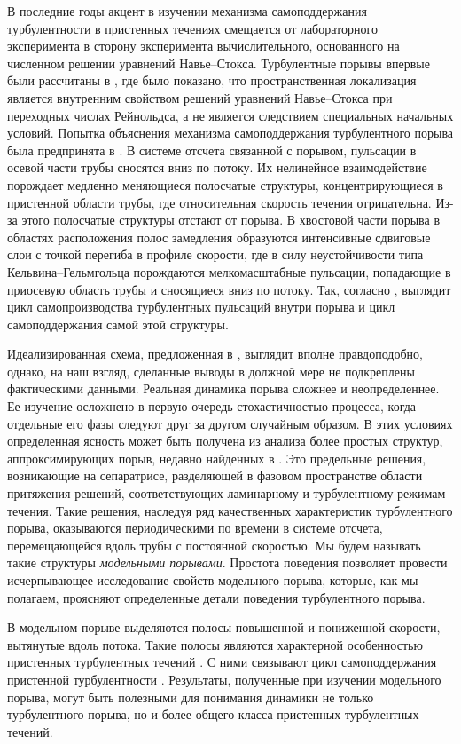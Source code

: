 В последние годы акцент в изучении механизма самоподдержания турбулентности в пристенных течениях смещается от лабораторного эксперимента в сторону эксперимента вычислительного, основанного на численном решении уравнений Навье--Стокса. Турбулентные порывы впервые были рассчитаны в \cite{Priymak2004}, где было показано, что пространственная локализация является внутренним свойством решений уравнений Навье--Стокса при переходных числах Рейнольдса, а не является следствием специальных начальных условий. Попытка объяснения механизма самоподдержания турбулентного порыва была предпринята в \cite{Shimizu2009}. В системе отсчета связанной с порывом, пульсации в осевой части трубы сносятся вниз по потоку. Их нелинейное взаимодействие порождает медленно меняющиеся полосчатые структуры, концентрирующиеся в пристенной области трубы, где относительная скорость течения отрицательна. Из-за этого полосчатые структуры отстают от порыва. В хвостовой части порыва в областях расположения полос замедления образуются интенсивные сдвиговые слои с точкой перегиба в профиле скорости, где в силу неустойчивости типа Кельвина--Гельмгольца порождаются мелкомасштабные пульсации, попадающие в приосевую область трубы и сносящиеся вниз по потоку. Так, согласно \cite{Shimizu2009}, выглядит цикл самопроизводства турбулентных пульсаций внутри порыва и цикл самоподдержания самой этой структуры.

Идеализированная схема, предложенная в \cite{Shimizu2009}, выглядит вполне правдоподобно, однако, на наш взгляд, сделанные выводы в должной мере не подкреплены фактическими данными. Реальная динамика порыва сложнее и неопределеннее. Ее изучение осложнено в первую очередь стохастичностью процесса, когда отдельные его фазы следуют друг за другом случайным образом. В этих условиях определенная ясность может быть получена из анализа более простых структур, аппроксимирующих порыв, недавно найденных в \cite{Skufca2006, Avila2013}. Это предельные решения, возникающие на сепаратрисе, разделяющей в фазовом пространстве области притяжения решений, соответствующих ламинарному и турбулентному режимам течения. Такие решения, наследуя ряд качественных характеристик турбулентного порыва, оказываются периодическими по времени в системе отсчета, перемещающейся вдоль трубы с постоянной скоростью. Мы будем называть такие структуры {\it модельными порывами}. Простота поведения позволяет провести исчерпывающее исследование свойств модельного порыва, которые, как мы полагаем, проясняют определенные детали поведения турбулентного порыва. 

В модельном порыве выделяются полосы повышенной и пониженной скорости, вытянутые вдоль потока. Такие полосы являются характерной особенностью пристенных турбулентных течений \cite{Klebanoff1962, Kline1967}. С ними связывают цикл самоподдержания пристенной турбулентности \cite{Hamilton1995, Waleffe1997, Schoppa2002}. Результаты, полученные при изучении модельного порыва, могут быть полезными для понимания динамики не только турбулентного порыва, но и более общего класса пристенных турбулентных течений. 


